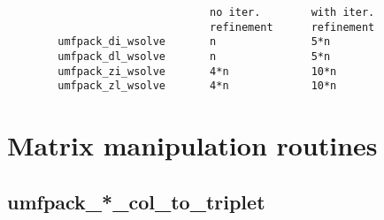 {\begin{verbatim}
                                no iter.        with iter.
                                refinement      refinement
        umfpack_di_wsolve       n               5*n
        umfpack_dl_wsolve       n               5*n
        umfpack_zi_wsolve       4*n             10*n
        umfpack_zl_wsolve       4*n             10*n
\end{verbatim}
}

\newpage
\section{Matrix manipulation routines}
\label{Manipulate}

\subsection{umfpack\_*\_col\_to\_triplet}

